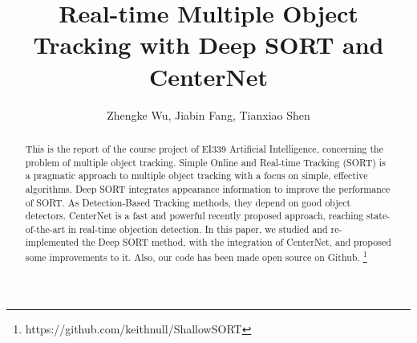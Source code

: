 \documentclass[conference]{IEEEtran}
\begin{document}
%
\title{Real-time Multiple Object Tracking with Deep SORT and CenterNet}
%
%
%

\author{
    Zhengke Wu,
    Jiabin Fang,
    Tianxiao Shen
}

%


\maketitle

\begin{abstract}
    This is the report of the course project of EI339 Artificial Intelligence, concerning the problem of multiple object tracking. Simple Online and Real-time Tracking (SORT) is a pragmatic approach to multiple object tracking with a focus on simple, effective algorithms. Deep SORT integrates appearance information to improve the performance of SORT. As Detection-Based Tracking methods, they depend on good object detectors. CenterNet is a fast and powerful recently proposed approach, reaching state-of-the-art in real-time objection detection. In this paper, we studied and re-implemented the Deep SORT method, with the integration of CenterNet, and proposed some improvements to it. Also, our code has been made open source on Github. \footnote{https://github.com/keithnull/ShallowSORT}
\end{abstract}
\end{document}
